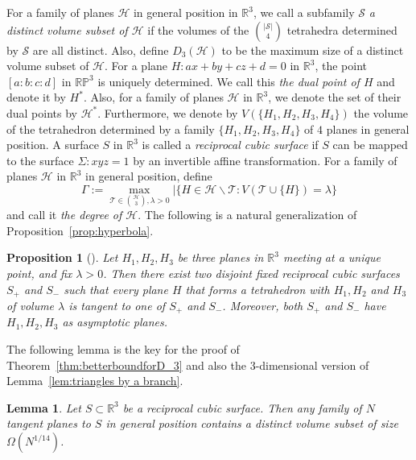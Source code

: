 \documentclass[a4paper,oneside,10pt]{amsart}
\newtheorem{lem}{Lemma}
\newtheorem{prop}{Proposition}
\begin{document}
For a family of planes $\mathcal{H}$ in general position in $\mathbb{R}^3$, we call a subfamily $\mathcal{S}$ \textit{a distinct volume subset of $\mathcal{H}$} if the volumes of the $\binom{|\mathcal{S}|}{4}$ tetrahedra determined by $\mathcal{S}$ are all distinct.
Also, define $D_3 (\mathcal{H})$ to be the maximum size of a distinct volume subset of $\mathcal{H}$.
For a plane $H: ax + by + cz + d = 0$ in $\mathbb{R}^3$, the point $[a:b:c:d]$ in $\mathbb{RP}^3$ is uniquely determined. We call this \textit{the dual point of $H$} and denote it by $H^{*}$. Also, for a family of planes $\mathcal{H}$ in $\mathbb{R}^3$, we denote the set of their dual points by $\mathcal{H}^{*}$.
Furthermore, we denote by $V(\{ H_1, H_2, H_3, H_4 \})$ the volume of the tetrahedron determined by a family $\{ H_1, H_2, H_3, H_4 \}$ of $4$ planes in general position.
A surface $S$ in $\mathbb{R}^3$ is called a \textit{reciprocal cubic surface} if
$S$ can be mapped to the surface $\Sigma: xyz=1$ by an invertible affine transformation.
For a family of planes $\mathcal{H}$ in $\mathbb{R}^3$ in general position, define
$$
\Gamma := \max_{\mathcal{T} \in \binom{\mathcal{H}}{3}, \lambda > 0} | \{ H \in \mathcal{H} \backslash \mathcal{T} : V(\mathcal{T} \cup \{H \} ) = \lambda \}
$$
and call it \textit{the degree of $\mathcal{H}$}.
The following is a natural generalization of Proposition~\ref{prop:hyperbola}.
\begin{prop}[\cite{furukawa2025simplex}] \label{tangent plane}
Let $H_1,H_2,H_3$ be three planes in $\mathbb{R}^3$ meeting at a unique point, and fix $\lambda>0$. Then there exist two disjoint fixed reciprocal cubic surfaces $S_{+}$ and $S_{-}$ such that every plane $H$ that forms a tetrahedron with $H_1, H_2$ and $H_3$ of volume $\lambda$ is tangent to one of $S_{+}$ and $S_{-}$. Moreover, both $S_{+}$ and $S_{-}$ have $H_1,H_2,H_3$ as asymptotic planes.
\end{prop}

The following lemma is the key for the proof of Theorem~\ref{thm:betterboundforD_3} and also the $3$-dimensional version of Lemma~\ref{lem:triangles by a branch}.
\begin{lem} \label{lem:surface}
Let $S \subset \mathbb{R}^3$ be a reciprocal cubic surface. Then any family of $N$ tangent planes to $S$ in general position contains a distinct volume subset of size $\Omega (N^{1/14})$.
\end{lem}
\end{document}
